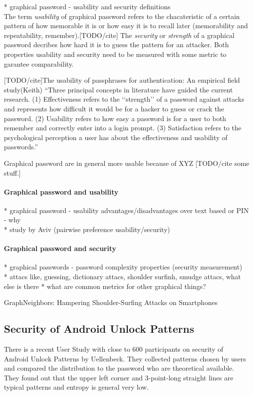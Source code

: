 \documentclass[twocolumn, a4paper, 10pt]{article}
\begin{document}
* graphical password - usability and security definitions\\
The term \emph{usability} of graphical password refers to the chacateristic of a certain pattern of how memorable it is or how easy it is to recall later (memorability and repeatability, remember).[TODO/cite] The \emph{security} or \emph{strength} of a graphical password decribes how hard it is to guess the pattern for an attacker. Both properties usability and security need to be measured with some metric to garantee comparability.

[TODO/cite]The usability of passphrases for authentication: An empirical field study(Keith)
``Three principal concepts in literature have guided the current research. (1) Effectiveness refers to the ‘‘strength’’ of a password against attacks and represents how difficult it would be for a hacker to guess or crack the password. (2) Usability refers to how easy a password is for a user to both remember and correctly enter into a login prompt. (3) Satisfaction refers to the psychological perception a user has about the effectiveness and usability of passwords.''

Graphical password are in general more usable because of XYZ [TODO/cite some stuff.]

\paragraph{Graphical password and usability}
* graphical password - usability advantages/disadvantages over text based or PIN - why\\
* study by Aviv (pairwise preference usability/security)


\paragraph{Graphical password and security}
* graphical passwords - password complexity properties (security measurement)\\
* attacs like, guessing, dictionary attacs, shoulder surfinh, smudge attacs, what else is there
* what are common metrics for other graphical things?

GraphNeighbors:
Hampering Shoulder-Surfing Attacks on Smartphones

\subsection{Security of Android Unlock Patterns}
There is a recent User Study with close to 600 participants on security of Android Unlock Patterns by Uellenbeck. They collected patterns chosen by users and compared the distribution to the password who are theoretical available. They found out that the upper left corner and 3-point-long straight lines are typical patterns and entropy is general very low.\\
\end{document}
